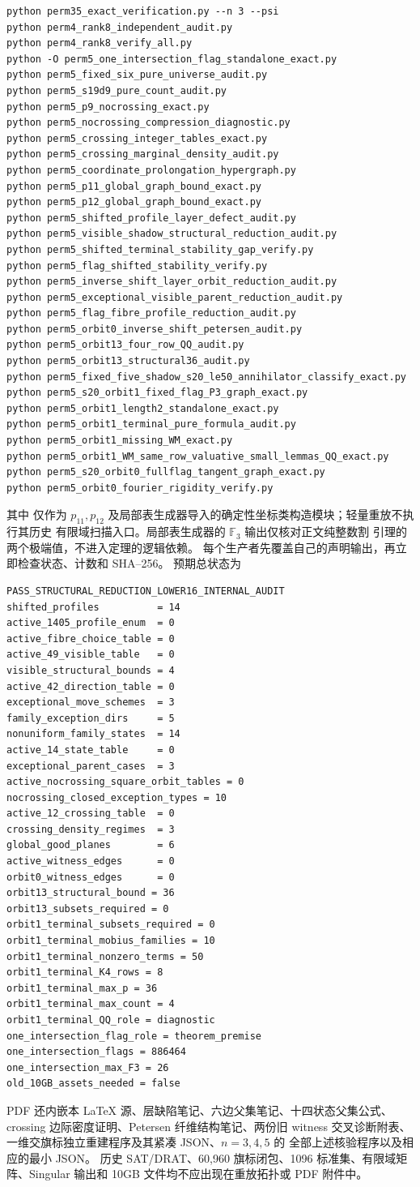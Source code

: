 \begin{verbatim}
python perm35_exact_verification.py --n 3 --psi
python perm4_rank8_independent_audit.py
python perm4_rank8_verify_all.py
python -O perm5_one_intersection_flag_standalone_exact.py
python perm5_fixed_six_pure_universe_audit.py
python perm5_s19d9_pure_count_audit.py
python perm5_p9_nocrossing_exact.py
python perm5_nocrossing_compression_diagnostic.py
python perm5_crossing_integer_tables_exact.py
python perm5_crossing_marginal_density_audit.py
python perm5_coordinate_prolongation_hypergraph.py
python perm5_p11_global_graph_bound_exact.py
python perm5_p12_global_graph_bound_exact.py
python perm5_shifted_profile_layer_defect_audit.py
python perm5_visible_shadow_structural_reduction_audit.py
python perm5_shifted_terminal_stability_gap_verify.py
python perm5_flag_shifted_stability_verify.py
python perm5_inverse_shift_layer_orbit_reduction_audit.py
python perm5_exceptional_visible_parent_reduction_audit.py
python perm5_flag_fibre_profile_reduction_audit.py
python perm5_orbit0_inverse_shift_petersen_audit.py
python perm5_orbit13_four_row_QQ_audit.py
python perm5_orbit13_structural36_audit.py
python perm5_fixed_five_shadow_s20_le50_annihilator_classify_exact.py
python perm5_s20_orbit1_fixed_flag_P3_graph_exact.py
python perm5_orbit1_length2_standalone_exact.py
python perm5_orbit1_terminal_pure_formula_audit.py
python perm5_orbit1_missing_WM_exact.py
python perm5_orbit1_WM_same_row_valuative_small_lemmas_QQ_exact.py
python perm5_s20_orbit0_fullflag_tangent_graph_exact.py
python perm5_orbit0_fourier_rigidity_verify.py
\end{verbatim}
其中  仅作为 $p_{11},p_{12}$
及局部表生成器导入的确定性坐标类构造模块；轻量重放不执行其历史
有限域扫描入口。局部表生成器的 $\mathbb F_3$ 输出仅核对正文纯整数割
引理的两个极端值，不进入定理的逻辑依赖。
每个生产者先覆盖自己的声明输出，再立即检查状态、计数和 SHA--256。
预期总状态为
\begin{verbatim}
PASS_STRUCTURAL_REDUCTION_LOWER16_INTERNAL_AUDIT
shifted_profiles          = 14
active_1405_profile_enum  = 0
active_fibre_choice_table = 0
active_49_visible_table   = 0
visible_structural_bounds = 4
active_42_direction_table = 0
exceptional_move_schemes  = 3
family_exception_dirs     = 5
nonuniform_family_states  = 14
active_14_state_table     = 0
exceptional_parent_cases  = 3
active_nocrossing_square_orbit_tables = 0
nocrossing_closed_exception_types = 10
active_12_crossing_table  = 0
crossing_density_regimes  = 3
global_good_planes        = 6
active_witness_edges      = 0
orbit0_witness_edges      = 0
orbit13_structural_bound = 36
orbit13_subsets_required = 0
orbit1_terminal_subsets_required = 0
orbit1_terminal_mobius_families = 10
orbit1_terminal_nonzero_terms = 50
orbit1_terminal_K4_rows = 8
orbit1_terminal_max_p = 36
orbit1_terminal_max_count = 4
orbit1_terminal_QQ_role = diagnostic
one_intersection_flag_role = theorem_premise
one_intersection_flags = 886464
one_intersection_max_F3 = 26
old_10GB_assets_needed = false
\end{verbatim}
PDF 还内嵌本 LaTeX 源、层缺陷笔记、六边父集笔记、十四状态父集公式、
crossing 边际密度证明、Petersen 纤维结构笔记、两份旧 witness
交叉诊断附表、一维交旗标独立重建程序及其紧凑 JSON、$n=3,4,5$ 的
全部上述核验程序以及相应的最小 JSON。
历史 SAT/DRAT、60,960 旗标闭包、1096 标准集、有限域矩阵、Singular
输出和 10GB 文件均不应出现在重放拓扑或 PDF 附件中。
